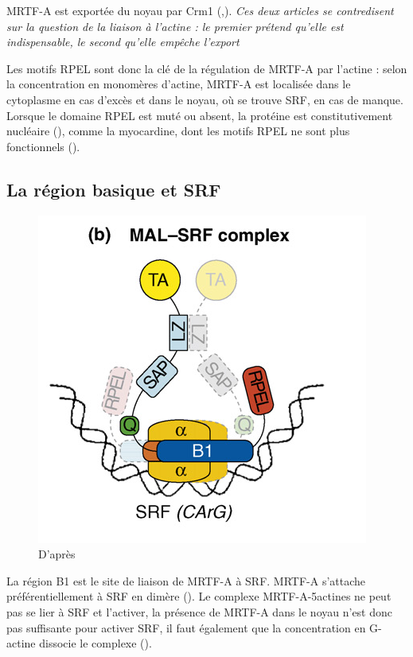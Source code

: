 \documentclass{report}
\begin{document}
 MRTF-A est exportée du noyau par Crm1 (\cite{vartiainen_nuclear_2007},\cite{hayashi_differences_2013}). \emph{Ces deux articles se contredisent sur la question de la liaison à l'actine : le premier prétend qu'elle est indispensable, le second qu'elle empêche l'export} 
 
 Les motifs RPEL sont donc la clé de la régulation de MRTF-A par l'actine : selon la concentration en monomères d'actine, MRTF-A est localisée dans le cytoplasme en cas d'excès et dans le noyau, où se trouve SRF, en cas de manque. Lorsque le domaine RPEL est muté ou absent, la protéine est constitutivement nucléaire (\cite{miralles_actin_2003}), comme la myocardine, dont les motifs RPEL ne sont plus fonctionnels (\cite{guettler_rpel_2008}). 
 
 \subsection{La région basique et SRF}
 \begin{figure}[h!]
 \includegraphics[scale=0.5]{MRTFA_SRF_complex.png}
 \caption{D'après \cite{posern_actin_2006}}
 \end{figure}
 La région B1 est le site de liaison de MRTF-A à SRF. MRTF-A s'attache préférentiellement à SRF en dimère (\cite{miralles_actin_2003}). Le complexe MRTF-A-5actines ne peut pas se lier à SRF et l'activer, la présence de MRTF-A dans le noyau n'est donc pas suffisante pour activer SRF, il faut également que la concentration en G-actine dissocie le complexe (\cite{vartiainen_nuclear_2007}). 
\end{document}
